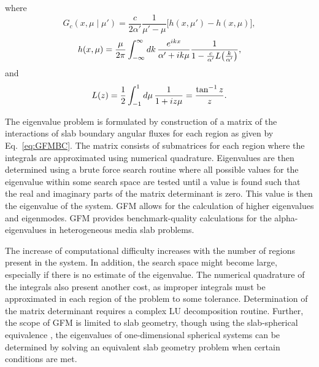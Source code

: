 where
\begin{equation}
	G_{c}(x, \mu \mid \mu') = \frac{c}{2\alpha'} \frac{1}{\mu' - \mu} \big [ h(x,\mu') - h(x,\mu) \big ],
\end{equation}
\begin{equation}
	h(x,\mu) = \frac{\mu}{2\pi} \int_{-\infty}^{\infty} \mathop{}\!d k \, \frac{e^{ikx}}{\alpha' + i k \mu} \frac{1}{1 - \frac{c}{\alpha'} L \big ( \frac{k}{\alpha'} \big ) },
\end{equation}
and
\begin{equation}
	L(z) = \frac{1}{2} \int_{-1}^{1} \mathop{}\!d \mu \, \frac{1}{1 + i z \mu} = \frac{\tan^{-1} z}{z}.
\end{equation}

The eigenvalue problem is formulated by construction of a matrix of the interactions of slab boundary angular fluxes for each region as given by Eq.~\ref{eq:GFMBC}. The matrix consists of submatrices for each region where the integrals are approximated using numerical quadrature. Eigenvalues are then determined using a brute force search routine where all possible values for the eigenvalue within some search space are tested until a value is found such that the real and imaginary parts of the matrix determinant is zero. This value is then the eigenvalue of the system. GFM allows for the calculation of higher eigenvalues and eigenmodes. GFM provides benchmark-quality calculations for the alpha-eigenvalues in heterogeneous media slab problems.

The increase of computational difficulty increases with the number of regions present in the system. In addition, the search space might become large, especially if there is no estimate of the eigenvalue. The numerical quadrature of the integrals also present another cost, as improper integrals must be approximated in each region of the problem to some tolerance. Determination of the matrix determinant requires a complex LU decomposition routine. Further, the scope of GFM is limited to slab geometry, though using the slab-spherical equivalence \cite{case1953introduction}, the eigenvalues of one-dimensional spherical systems can be determined by solving an equivalent slab geometry problem when certain conditions are met.

